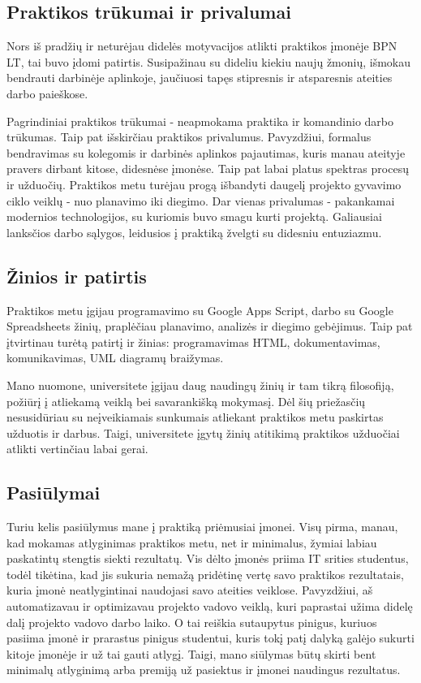 \documentclass{VUMIFPSkursinis}
\begin{document}
\subsection{Praktikos trūkumai ir privalumai}

Nors iš pradžių ir neturėjau didelės motyvacijos atlikti praktikos įmonėje BPN LT, tai buvo įdomi patirtis. Susipažinau su dideliu kiekiu naujų žmonių, išmokau bendrauti darbinėje aplinkoje, jaučiuosi tapęs stipresnis ir atsparesnis ateities darbo paieškose.

Pagrindiniai praktikos trūkumai - neapmokama praktika ir komandinio darbo trūkumas. Taip pat išskirčiau praktikos privalumus. Pavyzdžiui, formalus bendravimas su kolegomis ir darbinės aplinkos pajautimas, kuris manau ateityje pravers dirbant kitose, didesnėse įmonėse. Taip pat labai platus spektras procesų ir užduočių. Praktikos metu turėjau progą išbandyti daugelį projekto gyvavimo ciklo veiklų - nuo planavimo iki diegimo. Dar vienas privalumas - pakankamai modernios technologijos, su kuriomis buvo smagu kurti projektą. Galiausiai lanksčios darbo sąlygos, leidusios į praktiką žvelgti su didesniu entuziazmu.

\subsection{Žinios ir patirtis}

Praktikos metu įgijau programavimo su Google Apps Script, darbo su Google Spreadsheets žinių, praplėčiau planavimo, analizės ir diegimo gebėjimus. Taip pat įtvirtinau turėtą patirtį ir žinias: programavimas HTML, dokumentavimas, komunikavimas, UML diagramų braižymas.

Mano nuomone, universitete įgijau daug naudingų žinių ir tam tikrą filosofiją, požiūrį į atliekamą veiklą bei savarankišką mokymasį. Dėl šių priežasčių nesusidūriau su neįveikiamais sunkumais atliekant praktikos metu paskirtas užduotis ir darbus. Taigi, universitete įgytų žinių atitikimą praktikos užduočiai atlikti vertinčiau labai gerai.

\subsection{Pasiūlymai}
Turiu kelis pasiūlymus mane į praktiką priėmusiai įmonei. Visų pirma, manau, kad mokamas atlyginimas praktikos metu, net ir minimalus, žymiai labiau paskatintų stengtis siekti rezultatų. Vis dėlto įmonės priima IT srities studentus, todėl tikėtina, kad jis sukuria nemažą pridėtinę vertę savo praktikos rezultatais, kuria įmonė neatlygintinai naudojasi savo ateities veiklose. Pavyzdžiui, aš automatizavau ir optimizavau projekto vadovo veiklą, kuri paprastai užima didelę dalį projekto vadovo darbo laiko. O tai reiškia sutaupytus pinigus, kuriuos pasiima įmonė ir prarastus pinigus studentui, kuris tokį patį dalyką galėjo sukurti kitoje įmonėje ir už tai gauti atlygį. Taigi, mano siūlymas būtų skirti bent minimalų atlyginimą arba premiją už pasiektus ir įmonei naudingus rezultatus.
\end{document}
